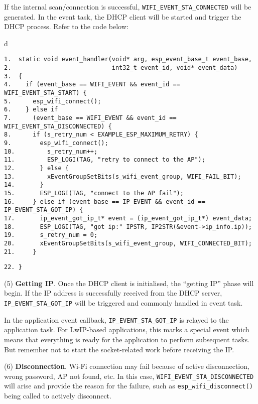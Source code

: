 \documentclass[a4paper,12pt]{book}
\begin{document}
If the internal scan/connection is successful, \verb|WIFI_EVENT_STA_CONNECTED| will be generated. In the event task, the DHCP client will be started and trigger the DHCP process. Refer to the code below:

\begin{codebloc}
\begin{tabular}{d}
\vspace{2pt}
\begin{verbatim}
1.  static void event_handler(void* arg, esp_event_base_t event_base,
2.                            int32_t event_id, void* event_data)
3.  {
4.    if (event_base == WIFI_EVENT && event_id == WIFI_EVENT_STA_START) {
5.      esp_wifi_connect();
6.    } else if
7.      (event_base == WIFI_EVENT && event_id == WIFI_EVENT_STA_DISCONNECTED) {
8.      if (s_retry_num < EXAMPLE_ESP_MAXIMUM_RETRY) {
9.        esp_wifi_connect();
10.         s_retry_num++;
11.         ESP_LOGI(TAG, "retry to connect to the AP");
12.       } else {
13.         xEventGroupSetBits(s_wifi_event_group, WIFI_FAIL_BIT);
14.       }
15.       ESP_LOGI(TAG, "connect to the AP fail");
16.     } else if (event_base == IP_EVENT && event_id == IP_EVENT_STA_GOT_IP) {
17.       ip_event_got_ip_t* event = (ip_event_got_ip_t*) event_data;
18.       ESP_LOGI(TAG, "got ip:" IPSTR, IP2STR(&event->ip_info.ip));
19.       s_retry_num = 0;
20.       xEventGroupSetBits(s_wifi_event_group, WIFI_CONNECTED_BIT);
21.     }
\end{verbatim}
\verb|22. }|
\end{tabular}
\end{codebloc}

(5) \textbf{Getting IP}. Once the DHCP client is initialised, the “getting IP” phase will begin. If the IP address is successfully received from the DHCP server, \verb|IP_EVENT_STA_GOT_IP| will be triggered and commonly handled in event task.

In the application event callback, \verb|IP_EVENT_STA_GOT_IP| is relayed to the application task. For LwIP-based applications, this marks a special event which means that everything is ready for the application to perform subsequent tasks. But remember not to start the socket-related work before receiving the IP.

(6) \textbf{Disconnection}. Wi-Fi connection may fail because of active disconnection, wrong password, AP not found, etc. In this case, \verb|WIFI_EVENT_STA_DISCONNECTED| will arise and provide the reason for the failure, such as \verb|esp_wifi_disconnect()| being called to actively disconnect.
\end{document}
